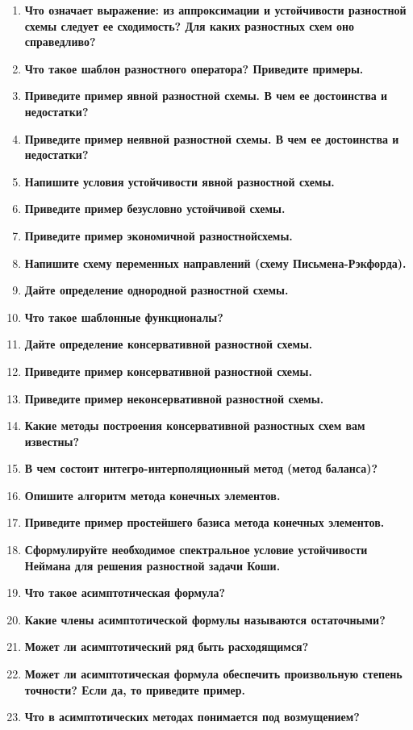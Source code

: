 \begin{enumerate}[label=\textbf{\underline{\arabic*.}}]
\item \textbf{Что означает выражение: из аппроксимации и устойчивости разностной схемы следует ее сходимость? Для каких разностных схем оно справедливо?}
\item \textbf{Что такое шаблон разностного оператора? Приведите примеры.}
\item \textbf{Приведите пример явной разностной схемы. В чем ее достоинства и недостатки?}
\item \textbf{Приведите пример неявной разностной схемы. В чем ее достоинства и недостатки?}
\item \textbf{Напишите условия устойчивости явной разностной схемы.}
\item \textbf{Приведите пример безусловно устойчивой схемы.}
\item \textbf{Приведите пример экономичной разностнойсхемы.}
\item \textbf{Напишите схему переменных направлений (схему Письмена-Рэкфорда).}
\item \textbf{Дайте определение однородной разностной схемы.}
\item \textbf{Что такое шаблонные функционалы?}
\item \textbf{Дайте определение консервативной разностной схемы.}
\item \textbf{Приведите пример консервативной разностной схемы.}
\item \textbf{Приведите пример неконсервативной разностной схемы.}
\item \textbf{Какие методы построения консервативной разностных схем вам известны?}
\item \textbf{В чем состоит интегро-интерполяционный метод (метод баланса)?}
\item \textbf{Опишите алгоритм метода конечных элементов.}
\item \textbf{Приведите пример простейшего базиса метода конечных элементов.}
\item \textbf{Сформулируйте необходимое спектральное условие устойчивости Неймана для решения разностной задачи Коши.}
\item \textbf{Что такое асимптотическая формула?}
\item \textbf{Какие члены асимптотической формулы называются остаточными?}
\item \textbf{Может ли асимптотический ряд быть расходящимся?}
\item \textbf{Может ли асимптотическая формула обеспечить произвольную степень точности? Если да, то приведите пример.}
\item \textbf{Что в асимптотических методах понимается под возмущением?}

\end{enumerate}
